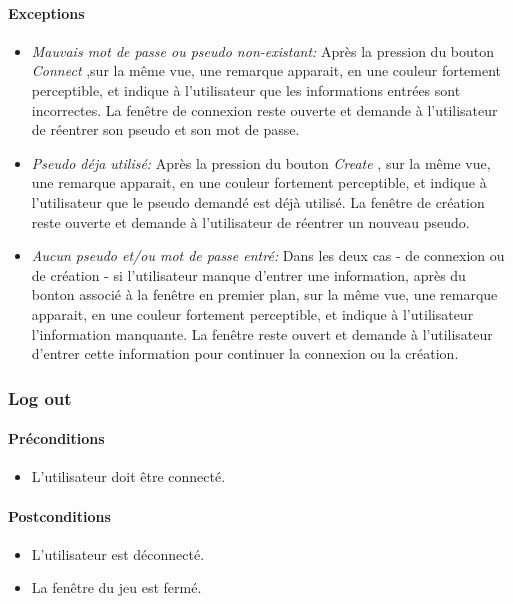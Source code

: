 \documentclass[a4paper,11pt]{report}
\begin{document}
\paragraph{Exceptions}
\begin{itemize}
 \item \textit{Mauvais mot de passe ou pseudo non-existant:} Après la pression du bouton \og \textit{Connect} \fg
 ,sur la même vue, une remarque apparait, en une couleur fortement
 perceptible, et indique à l'utilisateur que les informations entrées sont incorrectes. La fenêtre de connexion reste ouverte et
 demande à l'utilisateur de réentrer son pseudo et son mot de passe.
 \item \textit{Pseudo déja utilisé:} Après la pression du bouton \og \textit{Create} \fg,
 sur la même vue, une remarque apparait, en une couleur fortement
 perceptible, et indique à l'utilisateur que le pseudo demandé est déjà utilisé. La fenêtre de création reste ouverte
 et demande à l'utilisateur de réentrer un nouveau pseudo.
 \item \textit{Aucun pseudo et/ou mot de passe entré:} Dans les deux cas - de connexion ou de création - si l'utilisateur
 manque d'entrer une information, après du bonton associé à la fenêtre en premier plan, sur la même vue,
 une remarque apparait, en une couleur fortement perceptible, et indique à l'utilisateur l'information manquante. La
 fenêtre reste ouvert et demande à l'utilisateur d'entrer cette information pour continuer la connexion ou la création.
\end{itemize}

\subsubsection{Log out}
\paragraph{Préconditions}
\begin{itemize}
 \item L'utilisateur doit être connecté.
\end{itemize}
\paragraph{Postconditions}
\begin{itemize}
 \item L'utilisateur est déconnecté.
 \item La fenêtre du jeu est fermé.
\end{itemize}
\end{document}

